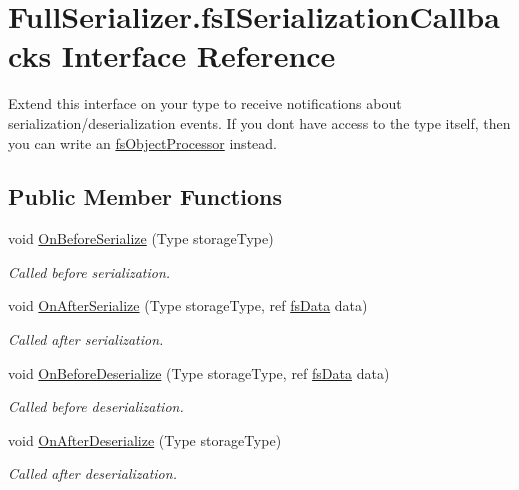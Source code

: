 \hypertarget{interface_full_serializer_1_1fs_i_serialization_callbacks}{}\section{Full\+Serializer.\+fs\+I\+Serialization\+Callbacks Interface Reference}
\label{interface_full_serializer_1_1fs_i_serialization_callbacks}


Extend this interface on your type to receive notifications about serialization/deserialization events. If you don\textquotesingle{}t have access to the type itself, then you can write an \hyperlink{class_full_serializer_1_1fs_object_processor}{fs\+Object\+Processor} instead.  


\subsection*{Public Member Functions}
\begin{DoxyCompactItemize}
\item 
void \hyperlink{interface_full_serializer_1_1fs_i_serialization_callbacks_a65a034ba3c5a1326d606bd286e78f196}{On\+Before\+Serialize} (Type storage\+Type)
\begin{DoxyCompactList}\small\item\em Called before serialization. \end{DoxyCompactList}\item 
void \hyperlink{interface_full_serializer_1_1fs_i_serialization_callbacks_ae5780792dded246dabf71cf38f22d1ac}{On\+After\+Serialize} (Type storage\+Type, ref \hyperlink{class_full_serializer_1_1fs_data}{fs\+Data} data)
\begin{DoxyCompactList}\small\item\em Called after serialization. \end{DoxyCompactList}\item 
void \hyperlink{interface_full_serializer_1_1fs_i_serialization_callbacks_a059856f60ed9d1b124ef4582820e6cde}{On\+Before\+Deserialize} (Type storage\+Type, ref \hyperlink{class_full_serializer_1_1fs_data}{fs\+Data} data)
\begin{DoxyCompactList}\small\item\em Called before deserialization. \end{DoxyCompactList}\item 
void \hyperlink{interface_full_serializer_1_1fs_i_serialization_callbacks_a02ea7926810ee12b131e62a8a8d9e931}{On\+After\+Deserialize} (Type storage\+Type)
\begin{DoxyCompactList}\small\item\em Called after deserialization. \end{DoxyCompactList}\end{DoxyCompactItemize}


